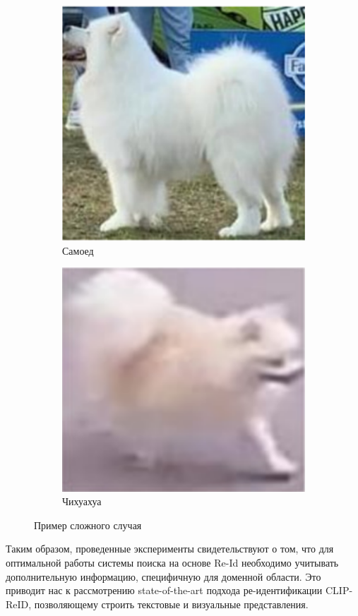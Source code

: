 \begin{figure}[ht]
	\centering
	\begin{subfigure}[b]{0.33\textwidth}
		\includegraphics{images/petsearch/confusion/big.png}
		\caption{Самоед}
		\label{fig:confusion_big}
	\end{subfigure}
	\begin{subfigure}[b]{0.33\textwidth}
		\includegraphics{images/petsearch/confusion/small.png}
		\caption{Чихуахуа}
		\label{fig:confusion_small}
	\end{subfigure}
	\caption{Пример сложного случая}
	\label{fig:confusion}
\end{figure}

Таким образом, проведенные эксперименты свидетельствуют о том, что для оптимальной работы системы поиска на основе Re-Id необходимо учитывать дополнительную информацию, специфичную для доменной области. Это приводит нас к рассмотрению state-of-the-art подхода ре-идентификации CLIP-ReID, позволяющему строить текстовые и визуальные представления.



\endinput